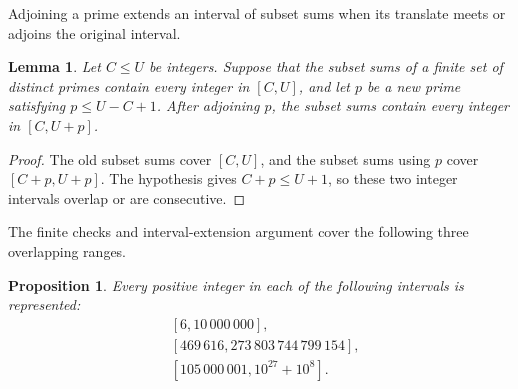 \documentclass[11pt,letterpaper,reqno]{amsart}
\numberwithin{equation}{section}
\newtheorem{lemma}[theorem]{Lemma}
\newtheorem{proposition}[theorem]{Proposition}
\theoremstyle{remark}
\renewcommand{\leq}{\leqslant}
\begin{document}
Adjoining a prime extends an interval of subset sums when its translate meets or adjoins the original interval.

\begin{lemma}
\label{lem:fraiture-extension}
Let $C\leq U$ be integers. Suppose that the subset sums of a finite set
of distinct primes contain every integer in $[C,U]$, and let $p$ be a new prime satisfying
$p\leq U-C+1$. After adjoining $p$, the subset sums contain every integer
in $[C,U+p]$.
\end{lemma}

\begin{proof}
The old subset sums cover $[C,U]$, and the subset sums using $p$ cover
$[C+p,U+p]$. The hypothesis gives $C+p\leq U+1$, so these two integer
intervals overlap or are consecutive.
\end{proof}

The finite checks and interval-extension argument cover the following three overlapping ranges.

\begin{proposition}
\label{prop:fraiture-finite}
Every positive integer in each of the following intervals is represented:
\begin{align}
 &[6,10\,000\,000],
 \label{eq:fraiture-small}\\
 &[469\,616,273\,803\,744\,799\,154],
 \label{eq:fraiture-first-window}\\
 &[105\,000\,001,10^{27}+10^8].
 \label{eq:fraiture-large-window}
\end{align}
\end{proposition}
\end{document}
